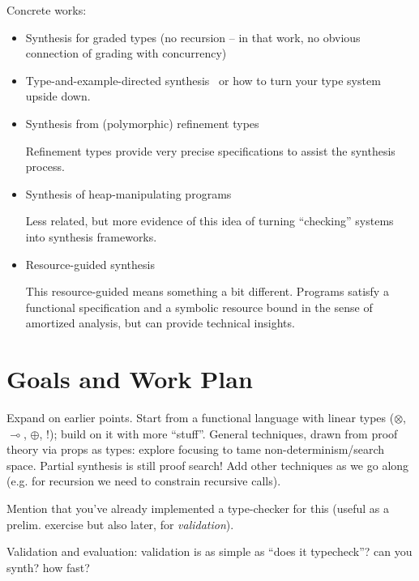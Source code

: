 \documentclass{llncs}
\newcommand{\lolli}{\multimap}
\newcommand{\tensor}{\otimes}
\newcommand{\bang}{{!}}
\begin{document}
Concrete works:
\begin{itemize}
\item Synthesis for graded types (no recursion   -- in that work, no
  obvious connection of grading with
  concurrency)~\cite{DBLP:conf/lopstr/HughesO20}

\item Type-and-example-directed
  synthesis~\cite{DBLP:conf/pldi/OseraZ15,DBLP:conf/popl/FrankleOWZ16}
  or how to turn your type system upside down.
  
\item Synthesis from (polymorphic) refinement types~\cite{DBLP:conf/pldi/PolikarpovaKS16}

Refinement types provide very precise specifications to assist the
synthesis process.

\item Synthesis of heap-manipulating
  programs~\cite{DBLP:journals/pacmpl/PolikarpovaS19}

Less related, but more evidence of this idea of turning ``checking''
systems into synthesis frameworks.

\item Resource-guided synthesis \cite{DBLP:conf/pldi/KnothWP019}

This resource-guided means something a bit different. Programs satisfy
a functional specification and a symbolic resource bound in the sense
of amortized analysis, but can provide technical insights.

\end{itemize}

\section{Goals and Work Plan}



Expand on earlier points. Start from a functional language with linear
types ($\tensor$, $\lolli$, $\oplus$, $\bang$); build on it with more
``stuff''. General techniques, drawn from proof theory via props as
types: explore focusing to tame non-determinism/search space. Partial
synthesis is still proof search! Add other techniques as we go along
(e.g. for recursion we need to constrain recursive calls).

Mention that you've already implemented a type-checker for this
(useful as a prelim. exercise but also later, for \emph{validation}).

Validation and evaluation: validation is as simple as ``does it typecheck''? can you synth? how fast?
\end{document}
